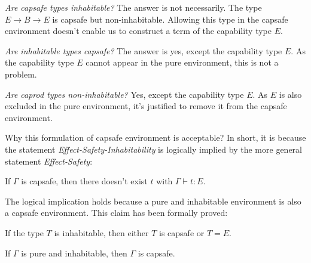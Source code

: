 \emph{Are capsafe types inhabitable?} The answer is not
necessarily. The type $E \to B \to E$ is capsafe but
non-inhabitable. Allowing this type in the capsafe environment doesn't
enable us to construct a term of the capability type $E$.

\emph{Are inhabitable types capsafe?} The answer is yes, except the
capability type $E$. As the capability type $E$ cannot appear in the
pure environment, this is not a problem.

\emph{Are caprod types non-inhabitable?} Yes, except the capability
type $E$. As $E$ is also excluded in the pure environment, it's
justified to remove it from the capsafe environment.


Why this formulation of capsafe environment is acceptable? In short,
it is because the statement \emph{Effect-Safety-Inhabitability} is
logically implied by the more general statement \emph{Effect-Safety}:

\begin{definition}
  If $\Gamma$ is capsafe, then there doesn't exist $t$ with
  $\Gamma \vdash t : E$.
\end{definition}

The logical implication holds because a pure and inhabitable
environment is also a capsafe environment. This claim has been
formally proved:

\begin{lemma}
  If the type $T$ is inhabitable, then either $T$ is capsafe or $T = E$.
\end{lemma}

\begin{theorem}
  If $\Gamma$ is pure and inhabitable, then $\Gamma$ is capsafe.
\end{theorem}


